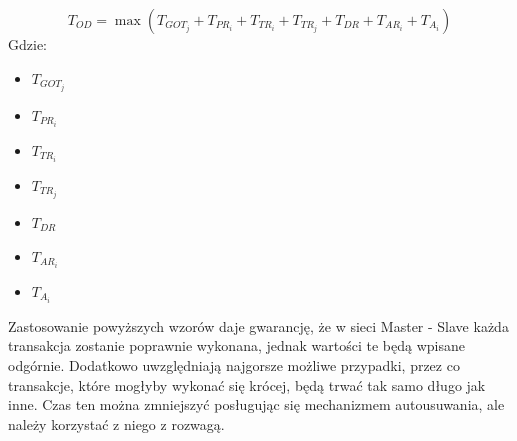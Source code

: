 \documentclass[a4paper,twoside]{article}
\begin{document}
	$$ T_{OD}=\max{(T_{GOT_j}+ T_{PR_i}+T_{TR_i}+T_{TR_j}+T_{DR}+T_{AR_i}+T_{A_i})} $$
	Gdzie:
	\begin{itemize}
		\item $ T_{GOT_j} $ 
		\item $ T_{PR_i} $ 
		\item $ T_{TR_i} $ 
		\item $ T_{TR_j} $ 
		\item $ T_{DR} $ 
		\item $ T_{AR_i} $ 
		\item $ T_{A_i} $ 
	\end{itemize}
	Zastosowanie powyższych wzorów daje gwarancję, że w sieci Master - Slave każda transakcja zostanie poprawnie wykonana, jednak wartości te będą wpisane odgórnie. Dodatkowo uwzględniają najgorsze możliwe przypadki, przez co transakcje, które mogłyby wykonać się krócej, będą trwać tak samo długo jak inne. Czas ten można zmniejszyć posługując się mechanizmem autousuwania, ale należy korzystać z niego z rozwagą.
\newpage
\end{document}
